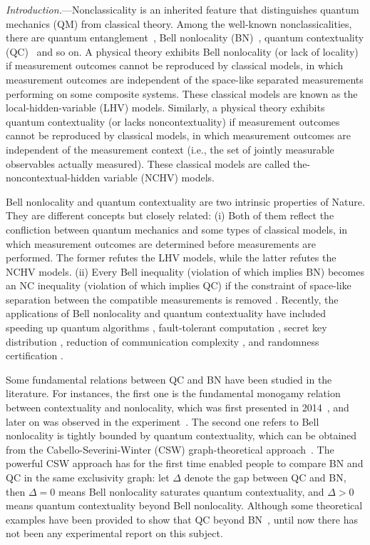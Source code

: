 \documentclass[prl,letterpaper,english,reprint,nofootinbib,aps,superscriptaddress,showpacs,showkeys]{revtex4-1}
\theoremstyle{definition}
\theoremstyle{remark}
\begin{document}
	\maketitle

\emph{Introduction.}---Nonclassicality is an inherited feature that distinguishes quantum mechanics (QM) from classical theory. Among the well-known nonclassicalities, there are quantum entanglement~\cite{Horodecki}, Bell nonlocality (BN)~\cite{Bell66}, quantum contextuality (QC)~\cite{KS67} and so on. A physical theory exhibits Bell nonlocality (or lack of locality) if measurement outcomes cannot be reproduced by classical models, in which measurement outcomes are independent of the space-like separated measurements performing on some composite systems. These classical models are known as the local-hidden-variable (LHV) models. Similarly, a physical theory exhibits quantum contextuality (or lacks noncontextuality) if measurement outcomes cannot be reproduced by classical models, in which measurement outcomes are independent of the measurement context (i.e., the set of jointly measurable observables actually measured). These classical models are called  the-noncontextual-hidden variable (NCHV) models.

Bell nonlocality and quantum contextuality are two intrinsic properties of Nature. They are different concepts but closely related: (i) Both of them reflect the confliction between quantum mechanics and some types of classical models, in which measurement outcomes are determined before measurements are performed. The former refutes the LHV models, while the latter refutes the NCHV models.
(ii) Every Bell inequality (violation of which implies BN) becomes an NC inequality (violation of which implies QC) if the constraint of space-like separation between the compatible measurements is removed \cite{Mermin,RDLTC14}. Recently, the applications of Bell nonlocality and quantum contextuality have included speeding up quantum algorithms \cite{Howard}, fault-tolerant computation \cite{Raussendorf13}, secret key distribution \cite{Ekert91,CDNS11}, reduction of communication complexity \cite{BZPZ04,BCMW10}, and randomness certification \cite{PAMBMMOHLMM10}.

Some fundamental relations between QC and BN have been studied in the literature. For instances, the first one is the fundamental monogamy relation between contextuality and nonlocality, which was first presented in 2014~\cite{Kurzynski}, and later on was observed in the experiment~\cite{Li}. The second one refers to Bell nonlocality is tightly bounded by quantum contextuality, which can be obtained from the Cabello-Severini-Winter (CSW) graph-theoretical approach~\cite{CSW14}. The powerful CSW approach has for the first time enabled people to compare BN and QC in the same exclusivity graph: let $\Delta$ denote the gap between QC and BN, then $\Delta=0$ means Bell nonlocality saturates quantum contextuality, and $\Delta>0$ means quantum contextuality beyond Bell nonlocality. Although some theoretical examples have been provided to show that QC beyond BN~\cite{RDLTC14,SBBC13}, until now there has not been any experimental report on this subject.
\end{document}
